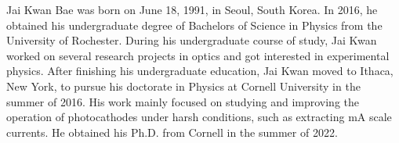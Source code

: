 \begin{biosketch}
Jai Kwan Bae was born on June 18, 1991, in Seoul, South Korea.
In 2016, he obtained his undergraduate degree of Bachelors of Science in Physics from the University of Rochester.
During his undergraduate course of study, Jai Kwan worked on several research projects in optics and got interested in experimental physics.
After finishing his undergraduate education, Jai Kwan moved to Ithaca, New York, to pursue his doctorate in Physics at Cornell University in the summer of 2016.
His work mainly focused on studying and improving the operation of photocathodes under harsh conditions, such as extracting mA scale currents.
He obtained his Ph.D. from Cornell in the summer of 2022.
\end{biosketch}